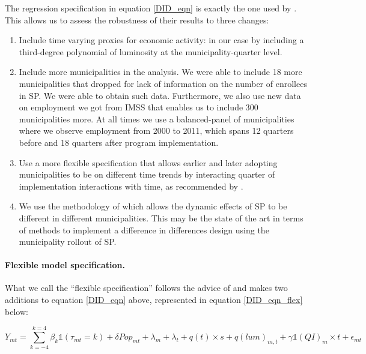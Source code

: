 \documentclass[oneside,11pt]{article}
\begin{document}
\vspace{.1in}
The regression specification in equation \ref{DID_eqn} is exactly the one used by \cite{Campos}. This allows us to assess the robustness of their results to three changes:

\begin{enumerate}
    \item Include time varying proxies for economic activity: in our case by including a third-degree polynomial of luminosity at the municipality-quarter level.
    \item Include more municipalities in the analysis. We were able to include 18 more municipalities that  \cite{Campos} dropped for lack of information on the number of enrollees in SP. We were able to obtain such data. Furthermore, we also use new data on employment we got from IMSS that enables us to include 300 municipalities more. At all times we use a balanced-panel of municipalities where we observe employment from 2000 to 2011, which spans 12 quarters before and 18 quarters after program implementation.
    \item Use a more flexible specification that allows earlier and later adopting municipalities to be on different time trends by interacting quarter of implementation interactions with time, as recommended by \cite{Wooldridge}.
    \item We use the methodology of \cite{deChaisemartin2020} which allows the dynamic effects of SP to be different in different municipalities. This may be the state of the art in terms of methods to implement a difference in differences design using the municipality rollout of SP.
\end{enumerate}


\paragraph{Flexible model specification.} What we call the ``flexible specification'' follows the advice of \cite{Wooldridge} and makes two additions to equation \ref{DID_eqn} above, represented in equation \ref{DID_eqn_flex} below:


\begin{equation} \label{DID_eqn_flex}
  Y_{mt}=\sum_{k=-4}^{k=4}\beta_{k}\mathds{1}(\tau_{mt}=k)+\delta Pop_{mt} + \lambda_m + \lambda_t + q(t)\times s +q(lum)_{m,t} + \gamma \mathds{1}(QI)_m \times t  + \epsilon_{mt}
\end{equation}
\end{document}
